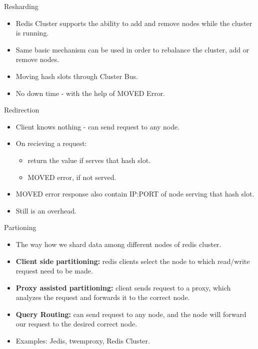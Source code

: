 \documentclass{beamer}
\begin{document}
\begin{frame}{Resharding}
\begin{itemize}
    \pause\item Redis Cluster supports the ability to add and remove nodes while the cluster is running.
    \pause\item Same basic mechanism can be used in order to rebalance the cluster, add or remove nodes.
    \pause\item Moving hash slots through Cluster Bus.
    \pause\item No down time - with the help of MOVED Error.
\end{itemize}
\end{frame}

\begin{frame}{Redirection}
\begin{itemize}
    \pause\item Client knows nothing - can send request to any node.
    \pause\item On recieving a request:
        \begin{itemize}
            \pause\item return the value if serves that hash slot.
            \pause\item MOVED error, if not served.
        \end{itemize}
    \pause\item MOVED error response also contain IP:PORT of node serving that hash slot.
    \pause\item Still is an overhead.
\end{itemize}
\end{frame}


\begin{frame}{Partioning}
\begin{itemize}
    \pause\item The way how we shard data among different nodes of redis cluster.
    \pause\item \textbf{Client side partitioning:} redis clients select the node to which read/write request need to be made.
    \pause\item \textbf{Proxy assisted partitioning:} client sends request to a proxy,
        which analyzes the request and forwards it to the correct node.
    \pause\item \textbf{Query Routing:} can send request to any node, and the node
        will forward our request to the desired correct node.
    \pause\item Examples: Jedis, twemproxy, Redis Cluster. 
\end{itemize}
\end{frame}
\end{document}
